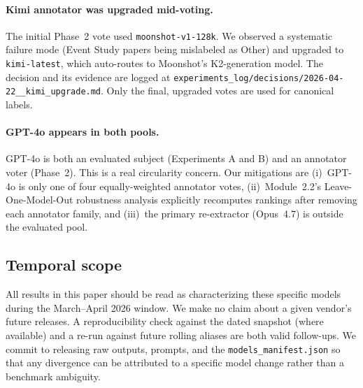 \paragraph{Kimi annotator was upgraded mid-voting.}
The initial Phase~2 vote used \texttt{moonshot-v1-128k}. We observed a
systematic failure mode (Event Study papers being mislabeled as Other)
and upgraded to \texttt{kimi-latest}, which auto-routes to Moonshot's
K2-generation model. The decision and its evidence are logged at
\texttt{experiments\_log/decisions/2026-04-22\_\_kimi\_upgrade.md}.
Only the final, upgraded votes are used for canonical labels.

\paragraph{GPT-4o appears in both pools.}
GPT-4o is both an evaluated subject (Experiments A and B) and an
annotator voter (Phase~2). This is a real circularity concern. Our
mitigations are (i)~GPT-4o is only one of four equally-weighted
annotator votes, (ii)~Module~2.2's Leave-One-Model-Out robustness
analysis explicitly recomputes rankings after removing each annotator
family, and (iii)~the primary re-extractor (Opus~4.7) is outside the
evaluated pool.

\subsection{Temporal scope}

All results in this paper should be read as characterizing these
specific models during the March--April 2026 window. We make no claim
about a given vendor's future releases. A reproducibility check against
the dated snapshot (where available) and a re-run against future rolling
aliases are both valid follow-ups. We commit to releasing raw outputs,
prompts, and the \texttt{models\_manifest.json} so that any divergence
can be attributed to a specific model change rather than a benchmark
ambiguity.
